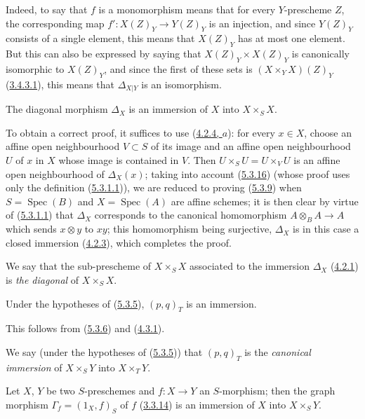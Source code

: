 Indeed, to say that $f$ is a monomorphism means that for every
$Y$-prescheme $Z$, the corresponding map
$f':X(Z)_Y\to Y(Z)_Y$ is an injection, and since $Y(Z)_Y$ consists of a single
element, this means that $X(Z)_Y$ has at most one element. But this can also
be expressed by saying that $X(Z)_Y\times X(Z)_Y$ is canonically isomorphic to
$X(Z)_Y$, and since the first of these sets is $(X\times_Y X)(Z)_Y$
(\hyperref[I.3.4.3.1]{3.4.3.1}), this means that $\Delta_{X|Y}$ is an
isomorphism.

\begin{proposition}[5.3.9]
\label{I.5.3.9}
The diagonal morphism $\Delta_X$ is an immersion of $X$ into
$X\times_S X$.
\end{proposition}

To obtain a correct proof, it
suffices to use (\hyperref[I.4.2.4]{4.2.4, $a$}): for every $x\in X$, choose an affine open neighbourhood $V\subset S$
of its image and an affine open neighbourhood $U$ of $x$ in $X$ whose
image is contained in $V$. Then $U\times_SU=U\times_VU$ is an
affine open neighbourhood of $\Delta_X(x)$;
taking into account (\hyperref[I.5.3.16]{5.3.16}) (whose proof uses only the definition
(\hyperref[I.5.3.1.1]{5.3.1.1})), we are reduced to proving (\hyperref[I.5.3.9]{5.3.9}) when
$S=\operatorname{Spec}(B)$ and $X=\operatorname{Spec}(A)$ are affine
schemes; it is then clear by virtue of (\hyperref[I.5.3.1.1]{5.3.1.1}) that $\Delta_X$ corresponds to
the canonical homomorphism $A\otimes_BA\to A$ which sends $x\otimes y$ to
$xy$; this homomorphism being surjective, $\Delta_X$ is in this case a
closed immersion (\hyperref[I.4.2.3]{4.2.3}), which completes the proof.

We say that the sub-prescheme of $X\times_S X$ associated to the immersion
$\Delta_X$ (\hyperref[I.4.2.1]{4.2.1}) is \emph{the diagonal} of
$X\times_S X$.

\begin{corollary}[5.3.10]
\label{I.5.3.10}
Under the hypotheses of (\hyperref[I.5.3.5]{5.3.5}), $(p,q)_T$ is an
immersion.
\end{corollary}

This follows from (\hyperref[I.5.3.6]{5.3.6}) and
(\hyperref[I.4.3.1]{4.3.1}).

We say (under the hypotheses of (\hyperref[I.5.3.5]{5.3.5})) that $(p,q)_T$
is the \emph{canonical immersion} of $X\times_S Y$ into $X\times_T Y$.

\begin{corollary}[5.3.11]
\label{I.5.3.11}
Let $X$, $Y$ be two $S$-preschemes and $f:X\to Y$ an $S$-morphism; then the
graph morphism $\Gamma_f=(1_X,f)_S$ of $f$
(\hyperref[I.3.3.14]{3.3.14}) is an immersion of $X$ into
$X\times_S Y$.
\end{corollary}

